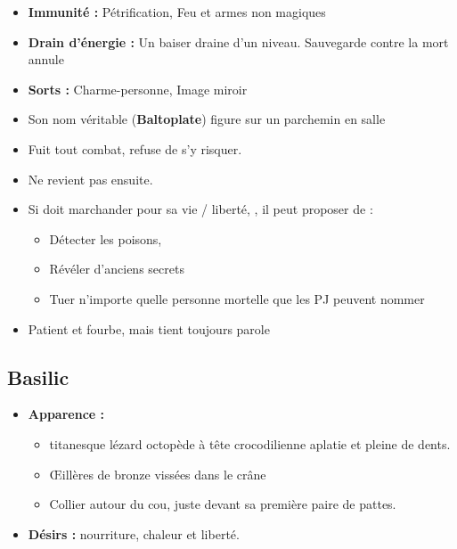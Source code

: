 \begin{itemize}
  \item \textbf{Immunité :} Pétrification, Feu et armes non magiques
  \item \textbf{Drain d'énergie :} Un baiser draine d'un niveau. Sauvegarde contre la mort annule
  \item \textbf{Sorts :} Charme-personne, Image miroir
  \item Son nom véritable (\textbf{Baltoplate}) figure  sur un parchemin en salle \textbf{}
  \item Fuit tout combat, refuse de s’y risquer. 
  \item Ne revient pas ensuite.
  \item Si doit marchander pour sa vie / liberté, , il peut proposer de :
  \begin{itemize}
    \item Détecter les poisons, 
    \item Révéler d’anciens secrets
    \item Tuer n’importe quelle personne mortelle que les PJ peuvent nommer
  \end{itemize}
  \item Patient et fourbe, mais tient toujours parole
\end{itemize}

\vfill
\pagebreak
\subsection{Basilic}\label{monster:n3:basilic}
\begin{itemize}
  \item \textbf{Apparence :} 
  \begin{itemize}
    \item titanesque lézard octopède à tête crocodilienne aplatie et pleine de dents. 
    \item \OE illères de bronze vissées dans le crâne 
    \item Collier autour du cou, juste devant sa première paire de pattes.
  \end{itemize}
  \item \textbf{ Désirs :} nourriture, chaleur et liberté.
\end{itemize}

